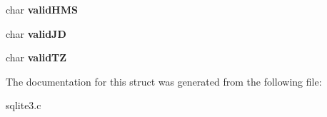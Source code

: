 \begin{DoxyCompactItemize}
\item 
\hypertarget{struct_date_time_aba26b32c6142cf6bfc09db3088b90add}{char {\bfseries valid\-H\-M\-S}}\label{struct_date_time_aba26b32c6142cf6bfc09db3088b90add}

\item 
\hypertarget{struct_date_time_a1962742892150a03dc5d302f43efbb04}{char {\bfseries valid\-J\-D}}\label{struct_date_time_a1962742892150a03dc5d302f43efbb04}

\item 
\hypertarget{struct_date_time_af3dfda2bdbb2183dc1b94f449701b81e}{char {\bfseries valid\-T\-Z}}\label{struct_date_time_af3dfda2bdbb2183dc1b94f449701b81e}

\end{DoxyCompactItemize}


The documentation for this struct was generated from the following file\-:\begin{DoxyCompactItemize}
\item 
sqlite3.\-c\end{DoxyCompactItemize}
